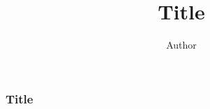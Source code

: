 \documentclass{xbeamer}
\title{Title}
\author{Author}
\institute{Institute}
\begin{document}
\maketitle

\begin{frame}
\frametitle{Title}
\end{frame}
\end{document}
